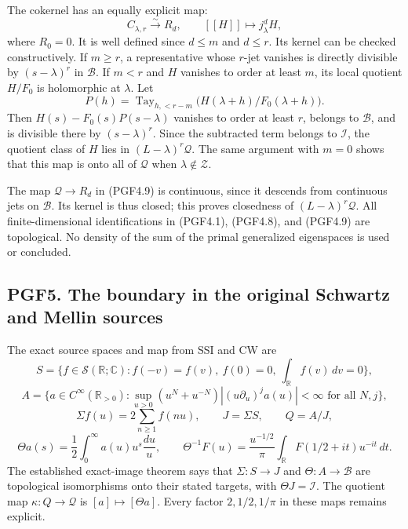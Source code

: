 The cokernel has an equally explicit map: \[
C_{\lambda,r}\xrightarrow{\sim} R_d,
\qquad [[H]]\longmapsto j^d_\lambda H,
\tag{PGF4.9}
\] where \(R_0=0\). It is well defined since \(d\le m\) and \(d\le r\).
Its kernel can be checked constructively. If \(m\ge r\), a
representative whose \(r\)-jet vanishes is directly divisible by
\((s-\lambda)^r\) in \(\mathcal B\). If \(m<r\) and \(H\) vanishes to
order at least \(m\), its local quotient \(H/F_0\) is holomorphic at
\(\lambda\). Let \[
P(h)=\operatorname{Tay}_{h,<r-m}\bigl(H(\lambda+h)/F_0(\lambda+h)\bigr).
\tag{PGF4.10}
\] Then \(H(s)-F_0(s)P(s-\lambda)\) vanishes to order at least \(r\),
belongs to \(\mathcal B\), and is divisible there by \((s-\lambda)^r\).
Since the subtracted term belongs to \(\mathcal I\), the quotient class
of \(H\) lies in \((L-\lambda)^r\mathcal Q\). The same argument with
\(m=0\) shows that this map is onto all of \(\mathcal Q\) when
\(\lambda\notin\mathscr Z\).

The map \(\mathcal Q\to R_d\) in (PGF4.9) is continuous, since it
descends from continuous jets on \(\mathcal B\). Its kernel is thus
closed; this proves closedness of \((L-\lambda)^r\mathcal Q\). All
finite-dimensional identifications in (PGF4.1), (PGF4.8), and (PGF4.9)
are topological. No density of the sum of the primal generalized
eigenspaces is used or concluded.

\subsection{PGF5. The boundary in the original Schwartz and Mellin
sources}\label{pgf5.-the-boundary-in-the-original-schwartz-and-mellin-sources}

The exact source spaces and map from SSI and CW are \[
S=\{f\in\mathcal S(\mathbb R;\mathbb C):f(-v)=f(v),\ f(0)=0,
\ \int_{\mathbb R}f(v)\,dv=0\},
\] \[
A=\{a\in C^\infty(\mathbb R_{>0}):
\sup_{u>0}(u^N+u^{-N})|(u\partial_u)^ja(u)|<\infty
\text{ for all }N,j\},
\] \[
\Sigma f(u)=2\sum_{n\ge1}f(nu),\qquad J=\Sigma S,
\qquad Q=A/J,
\tag{PGF5.1}
\] \[
\Theta a(s)=\frac12\int_0^\infty a(u)u^s\frac{du}{u},
\qquad
\Theta^{-1}F(u)=\frac{u^{-1/2}}\pi
\int_{\mathbb R}F(1/2+it)u^{-it}\,dt.
\tag{PGF5.2}
\] The established exact-image theorem says that \(\Sigma:S\to J\) and
\(\Theta:A\to\mathcal B\) are topological isomorphisms onto their stated
targets, with \(\Theta J=\mathcal I\). The quotient map
\(\kappa:Q\to\mathcal Q\) is \([a]\mapsto[\Theta a]\). Every factor
\(2,1/2,1/\pi\) in these maps remains explicit.

